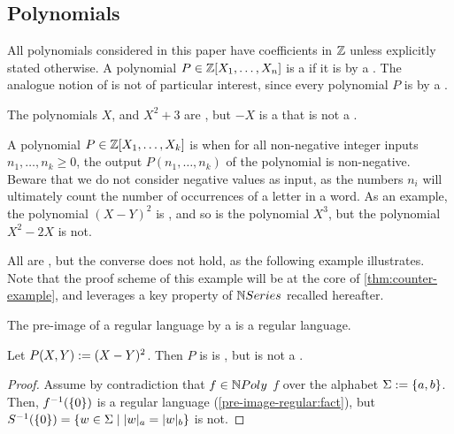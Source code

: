 \subsection{Polynomials} \AP All polynomials considered in this paper have
coefficients in $\mathbb{Z}$ unless explicitly stated otherwise. A polynomial $P \in
\mathbb{Z}[X_1, \dots, X_n]$ is a  if it is
 by a . The analogue notion of
 is not of particular interest, since every
polynomial $P$ is  by a .

\begin{example}
    \label{negative-not-nrat:ex}
    The polynomials $X$, and $X^2 + 3$ are ,
    but $- X$ is a  that is 
    not a .
\end{example}

\AP A polynomial $P \in \mathbb{Z}[X_1, \dots, X_k]$ is  when for
all non-negative integer inputs $n_1, \dots, n_k \geq 0$, the output  $P(n_1,
\dots, n_k)$ of the polynomial is non-negative. Beware that we do not consider
negative values as input, as the numbers $n_i$ will ultimately count the number
of occurrences of a letter in a word. As an example, the polynomial $(X - Y)^2$
is , and so is the polynomial $X^3$, but the polynomial $X^2 -
2X$ is not.

All  are , but the converse does
not hold,
as the following example illustrates. Note that the proof scheme of
this example will be at the core of \cref{thm:counter-example}, and leverages
a key property of $\NRat$ recalled hereafter.

\begin{fact}
    \label{pre-image-regular:fact}
    The pre-image of a regular language by a 
    is a regular language. 
\end{fact}

\begin{example}
    Let $P(X, Y) \mathrel{:=} (X - Y)^2$.
    Then $P$ is
    is , but is
    not a .
\end{example}
\begin{proof}
    Assume by contradiction that
    $f \in \NPoly$  $f$ over the alphabet $\Sigma \mathrel{:=} \mathopen{\{} a,b \mathclose{\}}$.
    Then, $f^{-1}(\mathopen{\{} 0 \mathclose{\}})$ is a regular language
    (\cref{pre-image-regular:fact}),
    but $S^{-1}(\set{0}) = \setof{ w \in \Sigma }{ \card[a]{w} = \card[b]{w} }$
    is not.
\end{proof}


